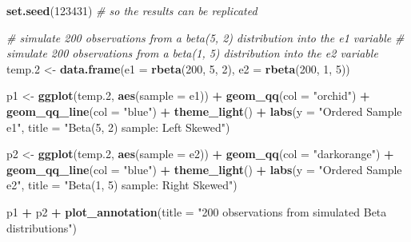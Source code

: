 \documentclass[
]{book}
\newenvironment{Shaded}{\begin{snugshade}}{\end{snugshade}}
\newcommand{\CommentTok}[1]{\textcolor[rgb]{0.56,0.35,0.01}{\textit{#1}}}
\newcommand{\DataTypeTok}[1]{\textcolor[rgb]{0.13,0.29,0.53}{#1}}
\newcommand{\DecValTok}[1]{\textcolor[rgb]{0.00,0.00,0.81}{#1}}
\newcommand{\FloatTok}[1]{\textcolor[rgb]{0.00,0.00,0.81}{#1}}
\newcommand{\KeywordTok}[1]{\textcolor[rgb]{0.13,0.29,0.53}{\textbf{#1}}}
\newcommand{\NormalTok}[1]{#1}
\newcommand{\OperatorTok}[1]{\textcolor[rgb]{0.81,0.36,0.00}{\textbf{#1}}}
\newcommand{\StringTok}[1]{\textcolor[rgb]{0.31,0.60,0.02}{#1}}
\begin{document}
\begin{Shaded}
\begin{Highlighting}[]
\KeywordTok{set.seed}\NormalTok{(}\DecValTok{123431}\NormalTok{) }\CommentTok{# so the results can be replicated}

\CommentTok{# simulate 200 observations from a beta(5, 2) distribution into the e1 variable}
\CommentTok{# simulate 200 observations from a beta(1, 5) distribution into the e2 variable}
\NormalTok{temp}\FloatTok{.2}\NormalTok{ <-}\StringTok{ }\KeywordTok{data.frame}\NormalTok{(}\DataTypeTok{e1 =} \KeywordTok{rbeta}\NormalTok{(}\DecValTok{200}\NormalTok{, }\DecValTok{5}\NormalTok{, }\DecValTok{2}\NormalTok{), }\DataTypeTok{e2 =} \KeywordTok{rbeta}\NormalTok{(}\DecValTok{200}\NormalTok{, }\DecValTok{1}\NormalTok{, }\DecValTok{5}\NormalTok{)) }

\NormalTok{p1 <-}\StringTok{ }\KeywordTok{ggplot}\NormalTok{(temp}\FloatTok{.2}\NormalTok{, }\KeywordTok{aes}\NormalTok{(}\DataTypeTok{sample =}\NormalTok{ e1)) }\OperatorTok{+}
\StringTok{    }\KeywordTok{geom_qq}\NormalTok{(}\DataTypeTok{col =} \StringTok{"orchid"}\NormalTok{) }\OperatorTok{+}\StringTok{ }\KeywordTok{geom_qq_line}\NormalTok{(}\DataTypeTok{col =} \StringTok{"blue"}\NormalTok{) }\OperatorTok{+}
\StringTok{    }\KeywordTok{theme_light}\NormalTok{() }\OperatorTok{+}
\StringTok{    }\KeywordTok{labs}\NormalTok{(}\DataTypeTok{y =} \StringTok{"Ordered Sample e1"}\NormalTok{,}
         \DataTypeTok{title =} \StringTok{"Beta(5, 2) sample: Left Skewed"}\NormalTok{)}

\NormalTok{p2 <-}\StringTok{ }\KeywordTok{ggplot}\NormalTok{(temp}\FloatTok{.2}\NormalTok{, }\KeywordTok{aes}\NormalTok{(}\DataTypeTok{sample =}\NormalTok{ e2)) }\OperatorTok{+}
\StringTok{    }\KeywordTok{geom_qq}\NormalTok{(}\DataTypeTok{col =} \StringTok{"darkorange"}\NormalTok{) }\OperatorTok{+}\StringTok{ }\KeywordTok{geom_qq_line}\NormalTok{(}\DataTypeTok{col =} \StringTok{"blue"}\NormalTok{) }\OperatorTok{+}
\StringTok{    }\KeywordTok{theme_light}\NormalTok{() }\OperatorTok{+}
\StringTok{    }\KeywordTok{labs}\NormalTok{(}\DataTypeTok{y =} \StringTok{"Ordered Sample e2"}\NormalTok{,}
         \DataTypeTok{title =} \StringTok{"Beta(1, 5) sample: Right Skewed"}\NormalTok{)}

\NormalTok{p1 }\OperatorTok{+}\StringTok{ }\NormalTok{p2 }\OperatorTok{+}\StringTok{ }\KeywordTok{plot_annotation}\NormalTok{(}\DataTypeTok{title =} \StringTok{"200 observations from simulated Beta distributions"}\NormalTok{)}
\end{Highlighting}
\end{Shaded}
\end{document}
